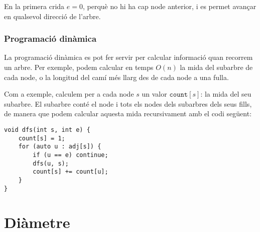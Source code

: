 En la primera crida $e=0$, perquè no hi ha cap node anterior, i es
permet avançar en qualsevol direcció de l'arbre.

\subsubsection{Programació dinàmica}

La programació dinàmica es pot fer servir per calcular informació quan
recorrem un arbre. Per exemple, podem calcular en temps $O(n)$ la mida
del subarbre de cada node, o la longitud del camí més llarg des de
cada node a una fulla.

Com a exemple, calculem per a cada node $s$ un valor
$\texttt{count}[s]$: la mida del seu subarbre. El subarbre conté el
node i tots els nodes dels subarbres dels seus fills, de manera que
podem calcular aquesta mida recursivament amb el codi següent:


\begin{lstlisting}
void dfs(int s, int e) {
    count[s] = 1;
    for (auto u : adj[s]) {
        if (u == e) continue;
        dfs(u, s);
        count[s] += count[u];
    }
}
\end{lstlisting}


\section{Diàmetre}


